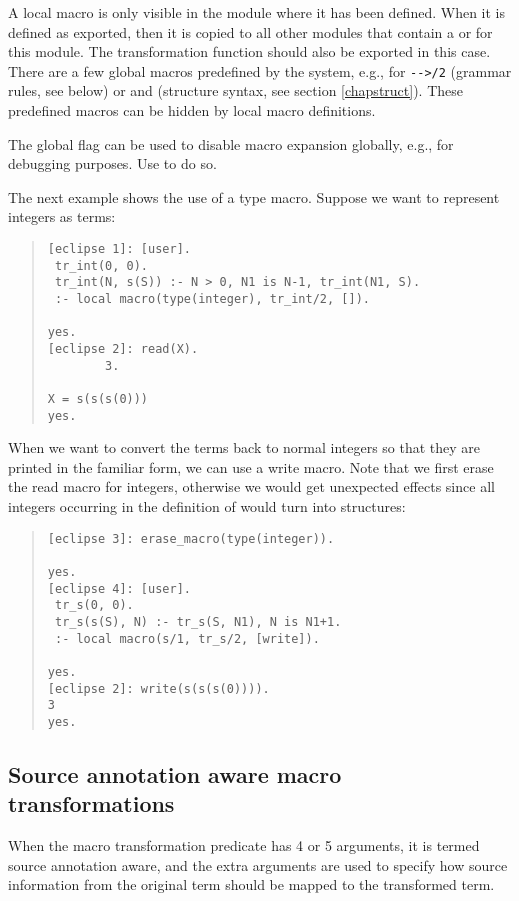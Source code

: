 A local macro is only visible in the module where it has been defined.
When it is defined as exported, then it is copied to all
other modules that contain a
 or
for this module.
The transformation function should also be exported in this case.
There are a few global macros predefined by the system, e.g., for
{\tt -}{\tt ->/2} (grammar rules, see below) or  and
(structure syntax, see section \ref{chapstruct}).
These predefined macros can be hidden by local macro definitions.

The global flag  can be used to disable
macro expansion globally, e.g., for debugging purposes.
Use  to do so.

The next example shows the use of a type macro. Suppose we want to represent
integers as  terms:
\begin{quote}
\begin{verbatim}
[eclipse 1]: [user].
 tr_int(0, 0).
 tr_int(N, s(S)) :- N > 0, N1 is N-1, tr_int(N1, S).
 :- local macro(type(integer), tr_int/2, []).

yes.
[eclipse 2]: read(X).
        3.

X = s(s(s(0)))
yes.
\end{verbatim}
\end{quote}
When we want to convert the  terms back to normal integers so that
they
are printed in the familiar form, we can use a write macro.
Note that we first erase the read macro for integers, otherwise we would get
unexpected effects since all integers occurring in the definition of
 would turn into  structures:
\begin{quote}
\begin{verbatim}
[eclipse 3]: erase_macro(type(integer)).

yes.
[eclipse 4]: [user].
 tr_s(0, 0).
 tr_s(s(S), N) :- tr_s(S, N1), N is N1+1.
 :- local macro(s/1, tr_s/2, [write]).

yes.
[eclipse 2]: write(s(s(s(0)))).
3
yes.
\end{verbatim}
\end{quote}

\subsection{Source annotation aware macro transformations}
\label{annotated}
When the macro transformation predicate has 4 or 5 arguments, it is termed
source annotation aware, and the extra
arguments are used to specify how source information from the
original term should be mapped to the transformed term.

